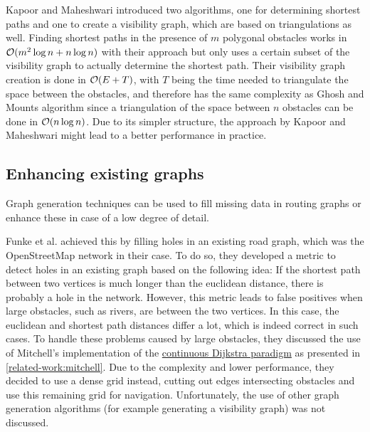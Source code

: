 		Kapoor and Maheshwari introduced two algorithms, one for determining shortest paths and one to create a visibility graph, which are based on triangulations as well\cite{kapoor-shortest-path-vgraph}.
		Finding shortest paths in the presence of $m$ polygonal obstacles works in $\mathcal{O}(m^2 \log{n} + n\log{n})$ with their approach but only uses a certain subset of the visibility graph to actually determine the shortest path.
		Their visibility graph creation is done in $\mathcal{O}(E+T)$, with $T$ being the time needed to triangulate the space between the obstacles, and therefore has the same complexity as Ghosh and Mounts algorithm since a triangulation of the space between $n$ obstacles can be done in $\mathcal{O}(n \log{n})$.
		Due to its simpler structure, the approach by Kapoor and Maheshwari might lead to a better performance in practice.
		
		
	
	\subsection{Enhancing existing graphs}
	
		Graph generation techniques can be used to fill missing data in routing graphs or enhance these in case of a low degree of detail.
		
		Funke et al. achieved this by filling holes in an existing road graph, which was the OpenStreetMap network in their case\cite{funke-osm-extrapolation}.
		To do so, they developed a metric to detect holes in an existing graph based on the following idea:
		If the shortest path between two vertices is much longer than the euclidean distance, there is probably a hole in the network.
		However, this metric leads to false positives when large obstacles, such as rivers, are between the two vertices.
		In this case, the euclidean and shortest path distances differ a lot, which is indeed correct in such cases.
		To handle these problems caused by large obstacles, they discussed the use of Mitchell's implementation of the \hyperref[subsec:continuous-dijkstra]{continuous Dijkstra paradigm} as presented in \cref{related-work:mitchell}.
		Due to the complexity and lower performance, they decided to use a dense grid instead, cutting out edges intersecting obstacles and use this remaining grid for navigation.
		Unfortunately, the use of other graph generation algorithms (for example generating a visibility graph) was not discussed.
		
